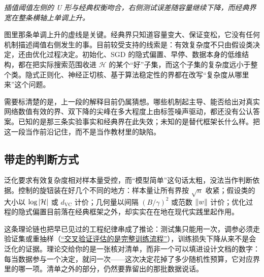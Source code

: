 \emph{插值阈值左侧的 U 形与经典权衡吻合，右侧测试误差随容量继续下降，而经典界宽在整条横轴上单调上升。}

图里那条单调上升的虚线是关键。经典界只知道容量变大、保证变松，它没有任何机制描述阈值右侧发生的事。目前较受支持的线索是：有效复杂度不只由假设类决定，还由优化过程决定。初始化、SGD 的隐式偏置、早停、数据本身的低维结构，都在把实际搜索范围收进 \(\mathcal{H}\) 的某个``好''子集，而这个子集的复杂度远小于整个类。隐式正则化、神经正切核、基于算法稳定性的界都在改写``复杂度从哪里来''这个问题。

需要标清楚的是，上一段的解释目前仍属猜想。哪些机制起主导、能否给出对真实网络数值有效的界、双下降的尖峰在多大程度上由标签噪声驱动，都还没有公认答案。已知的是那三条实验事实和经典界在此失效；未知的是替代框架长什么样。把这一段当作前沿记住，而不是当作教材里的缺陷。

\subsection{带走的判断方式}

泛化要求有效复杂度相对样本量受控，而``模型简单''这句话太粗，没法当作判断依据。控制的旋钮装在好几个不同的地方：样本量让所有界按 \(\sqrt{n}\) 收紧；假设类的大小以 \(\log\left|\mathcal{H}\right|\) 或 \(d_{\mathrm{VC}}\) 计价；几何量以间隔 \((B/\gamma)^2\) 或范数 \(\left\lVert w\right\rVert\) 计价；优化过程的隐式偏置目前落在经典框架之外，却实实在在地在现代实践里起作用。

这条理论链也把早已见过的工程纪律串成了推论：测试集只能用一次，调参必须走验证集或重抽样（\hyperref[sec:11-Mathematical-Statistics/06-Resampling-and-Model-Selection/03]{``交叉验证评估的是完整训练流程''}），训练损失下降从来不是会泛化的证据。理论交给你的是一张核对清单，而非一个可以填进设计文档的数字：每当数据参与一个决定，就问一次——这次决定花掉了多少随机性预算，它对应界里的哪一项。清单之外的部分，仍然要靠留出的那批数据说话。
